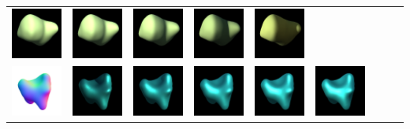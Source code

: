 \begin{center}
\begin{longtable}{@{}c@{}c@{}c@{}c@{}c@{}c@{}c@{}c@{}c@{}}
\includegraphics[width=0.1\linewidth]{training/22_3.png} & \includegraphics[width=0.1\linewidth]{training/22_4.png} &
\includegraphics[width=0.1\linewidth]{training/22_5.png} & \includegraphics[width=0.1\linewidth]{training/22_6.png} &
\includegraphics[width=0.1\linewidth]{training/22_7.png} \\
\includegraphics[width=0.1\linewidth]{training/23_gt.png} & \includegraphics[width=0.1\linewidth]{training/23_0.png} &
\includegraphics[width=0.1\linewidth]{training/23_1.png} & \includegraphics[width=0.1\linewidth]{training/23_2.png} &
\includegraphics[width=0.1\linewidth]{training/23_3.png} & \includegraphics[width=0.1\linewidth]{training/23_4.png} &

\end{longtable}
\end{center}
